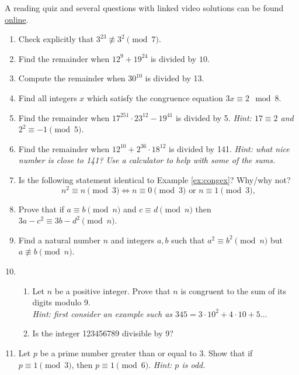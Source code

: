 \begin{exercises}{}{}
	A reading quiz and several questions with linked video solutions can be found \href{http://www.math.uci.edu/~ndonalds/math13/selftest/3-1-cong.html}{online}.


\begin{enumerate}
  \item Check explicitly that $3^{23}\not\equiv 3^2\pmod 7$.
  
  \item Find the remainder when $12^9+19^{24}$ is divided by $10$.
  
  \item Compute the remainder when $30^{10}$ is divided by 13.
  
  \item Find all integers $x$ which satisfy the congruence equation $3x\equiv 2\mod 8$.
  
  \item Find the remainder when $17^{251}\cdot 23^{12}-19^{41}$ is divided by 5. \emph{Hint: $17\equiv 2$ and $2^2\equiv -1\pmod 5$.}
  
  \item Find the remainder when $12^{10}+2^{36}\cdot 18^{12}$ is divided by 141. \emph{Hint: what nice number is close to 141? Use a calculator to help with some of the sums.}
  
  \item Is the following statement identical to Example \ref{ex:congex}? Why/why not?
  \[n^2\equiv n\pmod 3\iff n\equiv 0\pmod 3\text{ or }n\equiv 1\pmod 3,\]
  
  \item Prove that if $a\equiv b\pmod n$ and $c\equiv d\pmod n$ then $3a-c^2\equiv 3b-d^2\pmod n$.

  \item Find a natural number $n$ and integers $a,b$ such that $a^2\equiv b^2\pmod n$ but $a\not\equiv b\pmod n$.
  
  \item\begin{enumerate}
    \item Let $n$ be a positive integer. Prove that $n$ is congruent to the sum of its digits modulo 9.\\
    \emph{Hint: first consider an example such as $345=3\cdot 10^2+4\cdot 10+5\ldots$}
    \item Is the integer 123456789 divisible by 9?
  \end{enumerate}
  
  \item Let $p$ be a prime number greater than or equal to 3. Show that if $p\equiv 1\pmod 3$, then $p\equiv 1\pmod 6$. \emph{Hint: $p$ is odd.} 
  

\end{enumerate}
\end{exercises}
